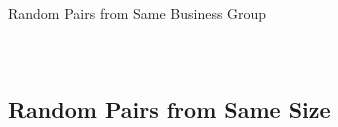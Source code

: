 \documentclass{beamer}
\begin{document}
\begin{frame}{Random Pairs from Same Business Group}
\begin{columns}
\begin{figure}
			\end{figure}
			
			
		\end{columns}
	\end{frame}
	
	
	
	\subsection{Random Pairs from Same Size}
	
\end{document}

